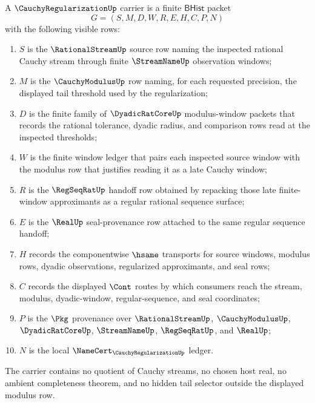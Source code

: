 \begin{definition}
\label{def:cauchyregularization-finite-carrier}
A $\CauchyRegularizationUp$ carrier is a finite $\mathsf{BHist}$ packet
$$
G=(S,M,D,W,R,E,H,C,P,N)
$$
with the following visible rows:
\begin{enumerate}
\item $S$ is the $\RationalStreamUp$ source row naming the inspected rational
Cauchy stream through finite $\StreamNameUp$ observation windows;
\item $M$ is the $\CauchyModulusUp$ row naming, for each requested precision,
the displayed tail threshold used by the regularization;
\item $D$ is the finite family of $\DyadicRatCoreUp$ modulus-window packets
that records the rational tolerance, dyadic radius, and comparison rows read
at the inspected thresholds;
\item $W$ is the finite window ledger that pairs each inspected source window
with the modulus row that justifies reading it as a late Cauchy window;
\item $R$ is the $\RegSeqRatUp$ handoff row obtained by repacking those late
finite-window approximants as a regular rational sequence surface;
\item $E$ is the $\RealUp$ seal-provenance row attached to the same regular
sequence handoff;
\item $H$ records the componentwise $\hsame$ transports for source windows,
modulus rows, dyadic observations, regularized approximants, and seal rows;
\item $C$ records the displayed $\Cont$ routes by which consumers reach the
stream, modulus, dyadic-window, regular-sequence, and seal coordinates;
\item $P$ is the $\Pkg$ provenance over $\RationalStreamUp$,
$\CauchyModulusUp$, $\DyadicRatCoreUp$, $\StreamNameUp$, $\RegSeqRatUp$, and
$\RealUp$;
\item $N$ is the local $\NameCert_{\CauchyRegularizationUp}$ ledger.
\end{enumerate}
The carrier contains no quotient of Cauchy streams, no chosen host real, no
ambient completeness theorem, and no hidden tail selector outside the
displayed modulus row.
\end{definition}


